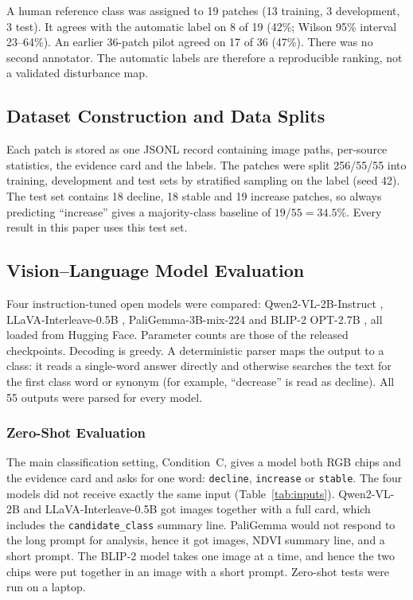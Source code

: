 A human reference class was assigned to 19 patches (13 training, 3
development, 3 test). It agrees with the automatic label on 8 of 19
(42\%; Wilson 95\% interval 23--64\%). An earlier
36-patch pilot agreed on 17 of 36 (47\%). There was no second
annotator. The automatic labels are therefore a reproducible ranking,
not a validated disturbance map.

\subsection{Dataset Construction and Data Splits}

Each patch is stored as one JSONL record containing image paths,
per-source statistics, the evidence card and the labels. The patches
were split 256/55/55 into training, development and test sets by
stratified sampling on the label (seed 42). The test set contains 18
decline, 18 stable and 19 increase patches, so always predicting
``increase'' gives a majority-class baseline of $19/55 = 34.5\%$. Every
result in this paper uses this test set.

\subsection{Vision--Language Model Evaluation}

Four instruction-tuned open models were compared:
Qwen2-VL-2B-Instruct ,
LLaVA-Interleave-0.5B ,
PaliGemma-3B-mix-224  and
BLIP-2 OPT-2.7B , all loaded from
Hugging Face. Parameter counts are those of the released checkpoints.
Decoding is greedy. A deterministic parser maps the output to a class:
it reads a single-word answer directly and otherwise searches the text
for the first class word or synonym (for example, ``decrease'' is read
as decline). All 55 outputs were parsed for every model.

\subsubsection{Zero-Shot Evaluation}

The main classification setting, Condition~C, gives a model both RGB
chips and the evidence card and asks for one word: \texttt{decline},
\texttt{increase} or \texttt{stable}. The four models did not receive
exactly the same input (Table~\ref{tab:inputs}). Qwen2-VL-2B and
LLaVA-Interleave-0.5B got images together with a full card, which includes
the \texttt{candidate\_class} summary line. PaliGemma would not respond
to the long prompt for analysis, hence it got images, NDVI summary line,
and a short prompt. The BLIP-2 model takes one image at a time, and hence
the two chips were put together in an image with a short prompt. Zero-shot
tests were run on a laptop.

